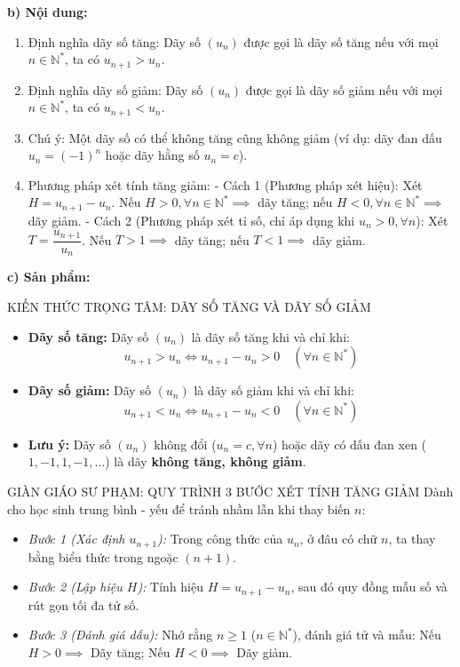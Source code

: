 \documentclass[12pt, a4paper]{article}
\begin{document}
\noindent \textbf{b) Nội dung:}  
\begin{enumerate}[leftmargin=0.6cm]  
    \item Định nghĩa dãy số tăng: Dãy số $(u_n)$ được gọi là dãy số tăng nếu với mọi $n \in \mathbb{N}^*$, ta có $u_{n+1} > u_n$.  
    \item Định nghĩa dãy số giảm: Dãy số $(u_n)$ được gọi là dãy số giảm nếu với mọi $n \in \mathbb{N}^*$, ta có $u_{n+1} < u_n$.  
    \item Chú ý: Một dãy số có thể không tăng cũng không giảm (ví dụ: dãy đan dấu $u_n = (-1)^n$ hoặc dãy hằng số $u_n = c$).  
    \item Phương pháp xét tính tăng giảm:  
    - Cách 1 (Phương pháp xét hiệu): Xét $H = u_{n+1} - u_n$. Nếu $H > 0, \forall n \in \mathbb{N}^* \implies$ dãy tăng; nếu $H < 0, \forall n \in \mathbb{N}^* \implies$ dãy giảm.  
    - Cách 2 (Phương pháp xét tỉ số, chỉ áp dụng khi $u_n > 0, \forall n$): Xét $T = \dfrac{u_{n+1}}{u_n}$. Nếu $T > 1 \implies$ dãy tăng; nếu $T < 1 \implies$ dãy giảm.  
\end{enumerate}  
  
\noindent \textbf{c) Sản phẩm:}  
  
\begin{pedabox}{KIẾN THỨC TRỌNG TÂM: DÃY SỐ TĂNG VÀ DÃY SỐ GIẢM}  
\begin{itemize}[leftmargin=0.6cm]  
    \item \textbf{Dãy số tăng:} Dãy số $(u_n)$ là dãy số tăng khi và chỉ khi:  
    $$u_{n+1} > u_n \iff u_{n+1} - u_n > 0 \quad (\forall n \in \mathbb{N}^*)$$  
    \item \textbf{Dãy số giảm:} Dãy số $(u_n)$ là dãy số giảm khi và chỉ khi:  
    $$u_{n+1} < u_n \iff u_{n+1} - u_n < 0 \quad (\forall n \in \mathbb{N}^*)$$  
    \item \textbf{Lưu ý:} Dãy số $(u_n)$ không đổi ($u_n = c, \forall n$) hoặc dãy có dấu đan xen ($1, -1, 1, -1,\dots$) là dãy \textbf{không tăng, không giảm}.  
\end{itemize}  
\end{pedabox}  
  
\begin{scaffoldbox}{GIÀN GIÁO SƯ PHẠM: QUY TRÌNH 3 BƯỚC XÉT TÍNH TĂNG GIẢM}  
Dành cho học sinh trung bình - yếu để tránh nhầm lẫn khi thay biến $n$:  
\begin{itemize}[leftmargin=0.6cm]  
    \item \textit{Bước 1 (Xác định $u_{n+1}$):} Trong công thức của $u_n$, ở đâu có chữ $n$, ta thay bằng biểu thức trong ngoặc $(n + 1)$.  
    \item \textit{Bước 2 (Lập hiệu $H$):} Tính hiệu $H = u_{n+1} - u_n$, sau đó quy đồng mẫu số và rút gọn tối đa tử số.  
    \item \textit{Bước 3 (Đánh giá dấu):} Nhớ rằng $n \ge 1$ ($n \in \mathbb{N}^*$), đánh giá tử và mẫu:  
    Nếu $H > 0 \implies$ Dãy tăng; Nếu $H < 0 \implies$ Dãy giảm.  
\end{itemize}  
\end{scaffoldbox}  
  
\end{document}
